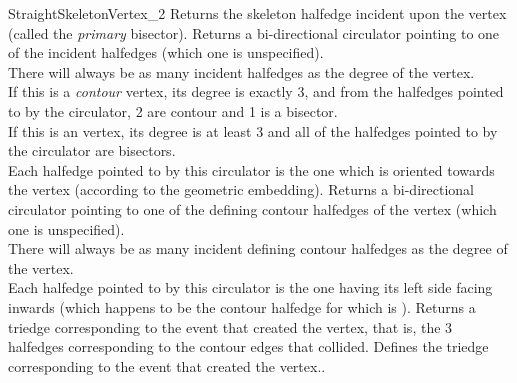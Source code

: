 \begin{ccRefConcept}{StraightSkeletonVertex_2}
\ccAccessFunctions
  \ccGlue
  \ccGlue
  \ccGlue
  \ccGlue
{Returns the skeleton halfedge incident upon the vertex (called the \textit{primary} bisector).}
  \ccGlue
  \ccGlue
{Returns a bi-directional circulator pointing to one of the incident halfedges (which one is unspecified).\\
There will always be as many incident halfedges as the degree of the vertex.\\
If this is a \textit{contour} vertex, its degree is exactly 3, and from the halfedges pointed to by the circulator, 2 are contour and 1 is a bisector.\\
If this is an  vertex, its degree is at least 3 and all of the halfedges pointed to by the circulator are bisectors.\\
Each halfedge pointed to by this circulator is the one which is oriented towards the vertex (according to the geometric embedding).}
  \ccGlue
  \ccGlue
{Returns a bi-directional circulator pointing to one of the defining contour halfedges of the vertex (which one is unspecified).\\
There will always be as many incident defining contour halfedges as the degree of the vertex.\\
Each halfedge pointed to by this circulator is the one having its left side facing inwards (which happens to be the contour halfedge for which  is ).}
  \ccGlue
{Returns a triedge corresponding to the event that created the vertex, that is, the 3 halfedges corresponding to the contour edges that collided.}
  \ccGlue
{Defines the triedge corresponding to the event that created the vertex..}



\end{ccRefConcept}

